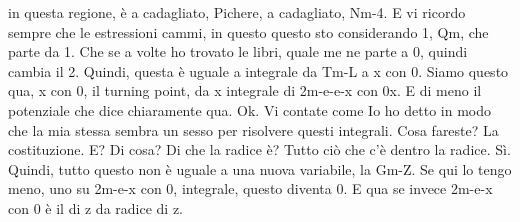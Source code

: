 \begin{soluzione}
in questa regione, è a cadagliato, Pichere, a cadagliato, Nm-4. E vi ricordo sempre che le estressioni cammi, in questo questo sto considerando 1, Qm, che parte da 1. Che se a volte ho trovato le libri, quale me ne parte a 0, quindi cambia il 2. Quindi, questa è uguale a integrale da Tm-L a x con 0. Siamo questo qua, x con 0, il turning point, da x integrale di 2m-e-e-x con 0x. E di meno il potenziale che dice chiaramente qua. Ok. Vi contate come Io ho detto in modo che la mia stessa sembra un sesso per risolvere questi integrali. Cosa fareste? La costituzione. E? Di cosa? Di che la radice è? Tutto ciò che c'è dentro la radice. Sì. Quindi, tutto questo non è uguale a una nuova variabile, la Gm-Z. Se qui lo tengo meno, uno su 2m-e-x con 0, integrale, questo diventa 0. E qua se invece 2m-e-x con 0 è il di z da radice di z.
   

\end{soluzione}
